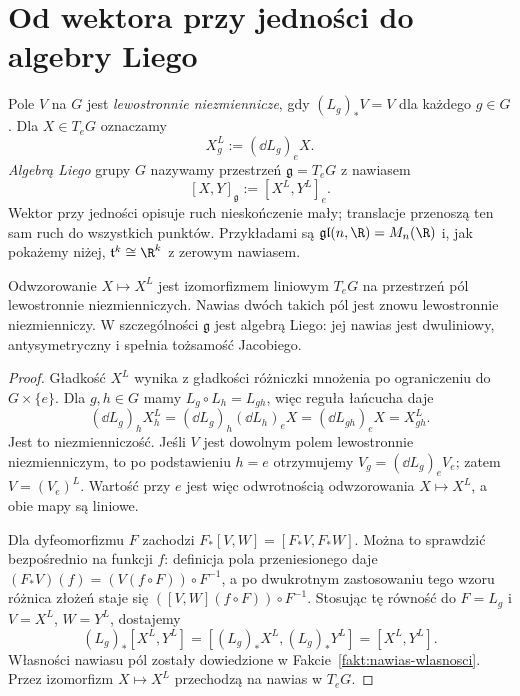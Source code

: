 \section{Od wektora przy jedności do algebry Liego}
\label{sec:algebra-liego}

\begin{definicja}
\label{def:algebra-liego}
Pole $V$ na $G$ jest \emph{lewostronnie niezmiennicze}, gdy
$(L_g)_*V=V$ dla każdego $g\in G$. Dla $X\in T_eG$ oznaczamy
\[
 X^L_g:=(\dd L_g)_eX.
\]
\emph{Algebrą Liego} grupy $G$ nazywamy przestrzeń
$\mathfrak g=T_eG$ z nawiasem
\[
 [X,Y]_{\mathfrak g}:=[X^L,Y^L]_e.
\]
Wektor przy jedności opisuje ruch nieskończenie mały; translacje
przenoszą ten sam ruch do wszystkich punktów. Przykładami są
$\mathfrak{gl}(n,\R)=M_n(\R)$ i, jak pokażemy niżej,
$\mathfrak t^k\cong\R^k$ z zerowym nawiasem.
\end{definicja}

\begin{twierdzenie}
\label{thm:lie-algebra-fields}
Odwzorowanie $X\mapsto X^L$ jest izomorfizmem liniowym
$T_eG$ na przestrzeń pól lewostronnie niezmienniczych.
Nawias dwóch takich pól jest znowu lewostronnie niezmienniczy.
W szczególności $\mathfrak g$ jest algebrą Liego: jej nawias jest
dwuliniowy, antysymetryczny i spełnia tożsamość Jacobiego.
\end{twierdzenie}
\begin{proof}
Gładkość $X^L$ wynika z gładkości różniczki mnożenia po
ograniczeniu do $G\times\{e\}$. Dla $g,h\in G$ mamy
$L_g\circ L_h=L_{gh}$, więc reguła łańcucha daje
\[
 (\dd L_g)_h X^L_h
 = (\dd L_g)_h(\dd L_h)_eX
 = (\dd L_{gh})_eX=X^L_{gh}.
\]
Jest to niezmienniczość. Jeśli $V$ jest dowolnym polem
lewostronnie niezmienniczym, to po podstawieniu $h=e$
otrzymujemy $V_g=(\dd L_g)_eV_e$; zatem $V=(V_e)^L$.
Wartość przy $e$ jest więc odwrotnością odwzorowania
$X\mapsto X^L$, a obie mapy są liniowe.

Dla dyfeomorfizmu $F$ zachodzi
$F_*[V,W]=[F_*V,F_*W]$. Można to sprawdzić bezpośrednio
na funkcji $f$: definicja pola przeniesionego daje
$(F_*V)(f)=(V(f\circ F))\circ F^{-1}$, a po dwukrotnym
zastosowaniu tego wzoru różnica złożeń staje się
$([V,W](f\circ F))\circ F^{-1}$.
Stosując tę równość do $F=L_g$ i $V=X^L$, $W=Y^L$,
dostajemy
\[
 (L_g)_*[X^L,Y^L]
 =[(L_g)_*X^L,(L_g)_*Y^L]=[X^L,Y^L].
\]
Własności nawiasu pól zostały dowiedzione w
Fakcie~\ref{fakt:nawias-wlasnosci}. Przez izomorfizm
$X\mapsto X^L$ przechodzą na nawias w $T_eG$.
\end{proof}

